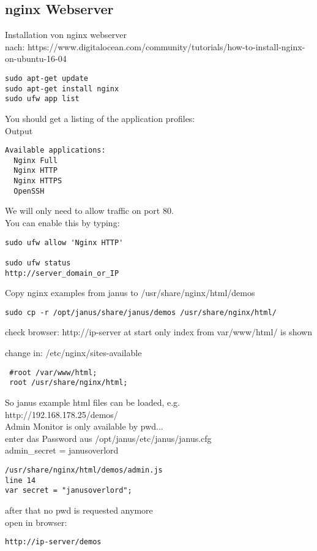 \subsection{nginx Webserver}
Installation von nginx webserver\\

nach: https://www.digitalocean.com/community/tutorials/how-to-install-nginx-on-ubuntu-16-04
\begin{verbatim}
sudo apt-get update
sudo apt-get install nginx
sudo ufw app list
\end{verbatim}

You should get a listing of the application profiles:\\
Output
\begin{verbatim}
Available applications:
  Nginx Full
  Nginx HTTP
  Nginx HTTPS
  OpenSSH
\end{verbatim}

We will only need to allow traffic on port 80.\\
You can enable this by typing:
\begin{verbatim}
sudo ufw allow 'Nginx HTTP'

sudo ufw status
http://server_domain_or_IP
\end{verbatim}

Copy nginx examples from janus to /usr/share/nginx/html/demos
\begin{verbatim}
sudo cp -r /opt/janus/share/janus/demos /usr/share/nginx/html/
\end{verbatim}
check browser: http://ip-server
at start only index from var/www/html/ is shown

change in: /etc/nginx/sites-available
\begin{verbatim}
 #root /var/www/html;
 root /usr/share/nginx/html;
\end{verbatim}
So janus example html files can be loaded, e.g.\\
http://192.168.178.25/demos/\\

Admin Monitor is only available by pwd...\\
enter das Password aus /opt/janus/etc/janus/janus.cfg\\ 
admin\_secret = janusoverlord
\begin{verbatim}
/usr/share/nginx/html/demos/admin.js
line 14
var secret = "janusoverlord";
\end{verbatim}
after that no pwd is requested anymore\\
open in browser:
\begin{verbatim}
http://ip-server/demos
\end{verbatim}

